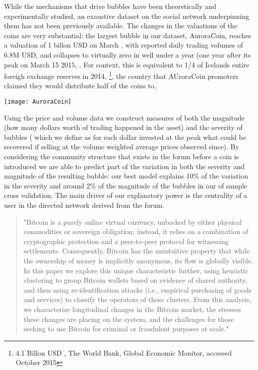 While the mechanisms that drive bubbles have been theoretically  \cite{abolafia1988enacting, earl2007decision, bakker2010social, harras2011grow} and experimentally \cite{moinas2013bubble} studied, an exaustive dataset on the social network underpinning them has not been previously available.
The changes in the valuations of the coins are very substantial: the largest bubble in our dataset, AuroraCoin, reaches a valuation of 1 billon USD on March , with reported daily trading volumes of 6.8M USD, and collapses to virtually zero in well under a year (one year after its peak on March 15 2015, .
For context, this is equivalent to 1/4 of Icelands entire foreigh exchange reserves in 2014, \footnote{4.1 Billon USD , The World Bank, Global Economic Monitor, accessed October 2015}, the country that AUroraCoin promoters claimed they would distribute half of the coins to, 

\begin{figure*}
\texttt{[image: AuroraCoin]}
\end{figure*}

Using the price and volume data we construct measures of both  the magnitude (how many dollars worth of trading happened in the asset) and the severity of bubbles ( which we define as for each dollar invested at the peak what could be recovered if selling at the volume weighted average prices observed since).
By considering the community structure that exists in the forum before a coin is introduced we are able to predict part of the variation in both the severity and magnitude of the resulting bubble: our best model explains 10\% of the variation in the severity and around 2\% of the magnitude of the bubbles in our of sample cross validation. 
The main driver of our explanatory power is the centrality of a user in the directed network derived from the forum.


\begin{quote}
"Bitcoin is a purely online virtual currency, unbacked by either physical commodities or sovereign obligation; instead, it relies on a combination of cryptographic protection and a peer-to-peer protocol for witnessing settlements. Consequently, Bitcoin has the unintuitive property that while the ownership of money is implicitly anonymous, its flow is globally visible. In this paper we explore this unique characteristic further, using heuristic clustering to group Bitcoin wallets based on evidence of shared authority, and then using re-identification attacks (i.e., empirical purchasing of goods and services) to classify the operators of those clusters. From this analysis, we characterize longitudinal changes in the Bitcoin market, the stresses these changes are placing on the system, and the challenges for those seeking to use Bitcoin for criminal or fraudulent purposes at scale." 
\end{quote} 
\cite{meiklejohn2013fistful}

